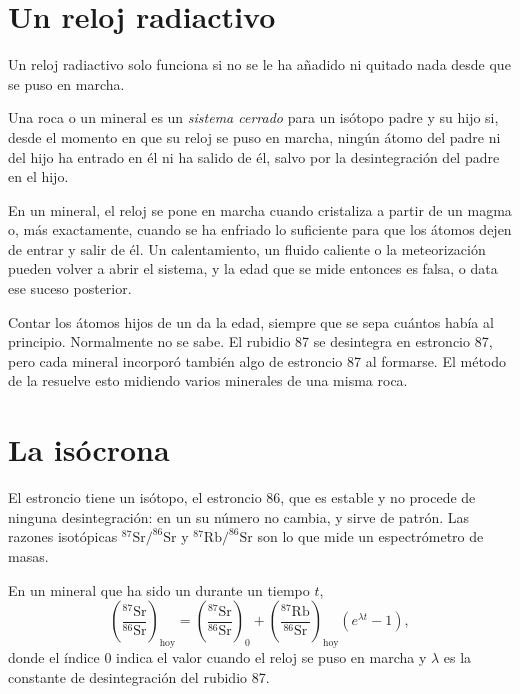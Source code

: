 \section{Un reloj radiactivo}

Un reloj radiactivo solo funciona si no se le ha añadido ni quitado nada
desde que se puso en marcha.

\begin{definition}\label{def:g12:age-of-the-earth:closed-system}
Una roca o un mineral es un \emph{sistema cerrado} para
un isótopo padre y su hijo si, desde el momento en que su reloj se puso en
marcha, ningún átomo del padre ni del hijo ha entrado en él ni ha salido de
él, salvo por la desintegración del padre en el hijo.
\end{definition}

En un mineral, el reloj se pone en marcha cuando cristaliza a partir de un
magma o, más exactamente, cuando se ha enfriado lo suficiente para que los
átomos dejen de entrar y salir de él. Un calentamiento, un fluido caliente o
la meteorización pueden volver a abrir el sistema, y la edad que se mide
entonces es falsa, o data ese suceso posterior.

Contar los átomos hijos de un  da la edad, siempre que se sepa
cuántos había al principio. Normalmente no se sabe. El rubidio 87 se
desintegra en estroncio 87, pero cada mineral incorporó también algo de
estroncio 87 al formarse. El método de la  resuelve esto midiendo
varios minerales de una misma roca.

\section{La isócrona}

El estroncio tiene un isótopo, el estroncio 86, que es estable y no procede
de ninguna desintegración: en un  su número no cambia, y sirve
de patrón. Las razones isotópicas $^{87}\mathrm{Sr}/^{86}\mathrm{Sr}$ y
$^{87}\mathrm{Rb}/^{86}\mathrm{Sr}$ son lo que mide un espectrómetro de masas.

\begin{theorem}\label{thm:g12:age-of-the-earth:isochron}
En un mineral que ha sido un  durante un tiempo $t$,
\[
  \left(\frac{^{87}\mathrm{Sr}}{^{86}\mathrm{Sr}}\right)_{\text{hoy}}
  = \left(\frac{^{87}\mathrm{Sr}}{^{86}\mathrm{Sr}}\right)_{0}
  + \left(\frac{^{87}\mathrm{Rb}}{^{86}\mathrm{Sr}}\right)_{\text{hoy}}
  \left(e^{\lambda t} - 1\right),
\]
donde el índice 0 indica el valor cuando el reloj se puso en marcha y
$\lambda$ es la constante de desintegración del rubidio 87.
\end{theorem}

